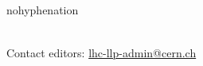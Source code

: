 

\thispagestyle{empty}%

\begin{fullwidth}
\sffamily
{
  \Large
  \fontsize{18}{24}\selectfont 
  \@title
}\\
\vspace{1\baselineskip}
{\Large 
\noindent
\@date\\
\vspace{1\baselineskip}
\noindent
 \\
~\\

\begin{hyphenrules}{nohyphenation}

\end{hyphenrules}

~\\
\noindent Contact editors: \href{mailto:lhc-lp-admin@cern.ch}{lhc-llp-admin@cern.ch}
}\\
\end{fullwidth}
\vspace*{\fill}

